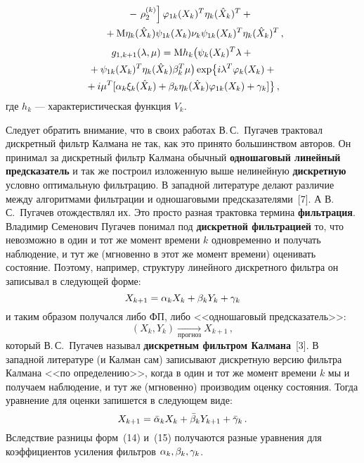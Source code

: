 \begin{multicols}{2}
\begin{align*}
&\ \ \ \ \ \ \ \ \ \ \ \ \ \ {}-\left. \rho_2^{(k)}\right ] \varphi_{1k} 
(X_k)^T
\eta_k(\hat X_k)^T+{}\\
& \ \ \ \ \ \ \ {}+ {\rm M} \eta_k (\hat X_k) \psi_{1k} (X_k) \nu_k \psi_{1k} (X_k)^T \eta_k(\hat X_k)^T\,, %
\end{align*}
\begin{multline*}
g_{1,k+1} (\lambda,\mu) = {\rm M} h_k \bigl( \psi_k (X_k)^T \lambda +{}\\
{}+ \psi_{1k} (X_k)^T \eta_k (\hat X_k)
\beta_k^T\mu \bigr) \exp \bigl\{ i\lambda^T \varphi_k (X_k) +{}\\
{}+ i\mu^T [ \alpha_k \xi_k (\hat X_k)+ \beta_k\eta_k (\hat X_k) \varphi_{1k} 
(X_k) +\gamma_k]\bigr\}\,,
\end{multline*}
где $h_k$ --- характеристическая функция $V_k$.

Следует обратить внимание, что в своих работах В.\,С.~Пугачев трактовал 
дискретный фильтр Калмана не так, как это принято большинством авторов. Он 
принимал
 за
дискретный фильтр Калмана обычный {\bf одношаговый линейный предсказатель\/} и 
так же построил изложенную выше нелинейную {\bf дискретную\/} условно 
оптимальную фильтрацию. В западной литературе делают различие между алгоритмами 
фильтрации и одношаговыми предсказателями~[7]. А В.\,С.~Пугачев отождествлял 
их. Это просто разная трактовка термина {\bf фильтрация\/}. Владимир Семенович 
Пугачев понимал под \textbf{дискретной фильтрацией} то, что невозможно в один и 
тот же момент времени $k$ одновременно и получать наблюдение, и тут же 
(мгновенно в этот же момент времени) оценивать состояние. Поэтому, например, 
структуру линейного дискретного фильтра он записывал в сле\-ду\-ющей форме:
 \begin{equation} %
X_{k+1} =\alp_k X_k +\beta_k Y_k +\gamma_k
\end{equation}
и таким образом получался либо ФП, либо <<одношаговый
предсказатель>>:
 \begin{equation*}
  (X_k,Y_k) \xrightarrow[\mathrm{прогноз}]{\ } X_{k+1}\,,
\end{equation*}
который В.\,С.~Пугачев называл {\bf дискретным фильтром Калмана\/}~[3]. В 
западной литературе
 (и Калман сам) записывают дискретную версию фильтра Калмана <<по определению>>, когда в один и тот
 же момент времени $k$ мы и получаем наблюдение, и тут же (мгновенно) производим оценку состояния.
 Тогда уравнение для оценки запишется в сле\-ду\-ющем виде:
 \begin{equation} %
X_{k+1} =\bar\alp_k X_k +\bar\beta_k Y_{k+1} +\bar\gamma_k\,.
\end{equation}
Вследствие разницы форм~(14) и~(15) получаются разные уравнения
для коэффициентов усиления фильтров $\alpha_k, \beta_k, \gamma_k$.


\end{multicols}
